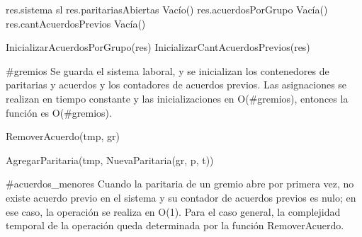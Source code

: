 {
	\state res.sistema \asig sl								
	\state res.paritariasAbiertas \asig Vac\'io()				
	\state res.acuerdosPorGrupo \asig Vac\'ia()		
	\state res.cantAcuerdosPrevios \asig Vac\'ia()					
	\state

	\state InicializarAcuerdosPorGrupo(res)			
	\state InicializarCantAcuerdosPrevios(res)						
}
{\#gremios}
{ Se guarda el sistema laboral, y se inicializan los contenedores de paritarias y acuerdos y los contadores de acuerdos previos. Las asignaciones se realizan en tiempo constante y las inicializaciones en O(\#gremios), entonces la funci\'on es O(\#gremios). }

{
					
		\state RemoverAcuerdo(tmp, gr)							
	\endif
	\state

	\state AgregarParitaria(tmp, NuevaParitaria(gr, p, t))		
}
{\#acuerdos\_menores}
{ Cuando la paritaria de un gremio abre por primera vez, no existe acuerdo previo en el sistema y su contador de acuerdos previos es nulo; en ese caso, la operaci\'on se realiza en O(1). Para el caso general, la complejidad temporal de la operaci\'on queda determinada por la funci\'on RemoverAcuerdo. }

